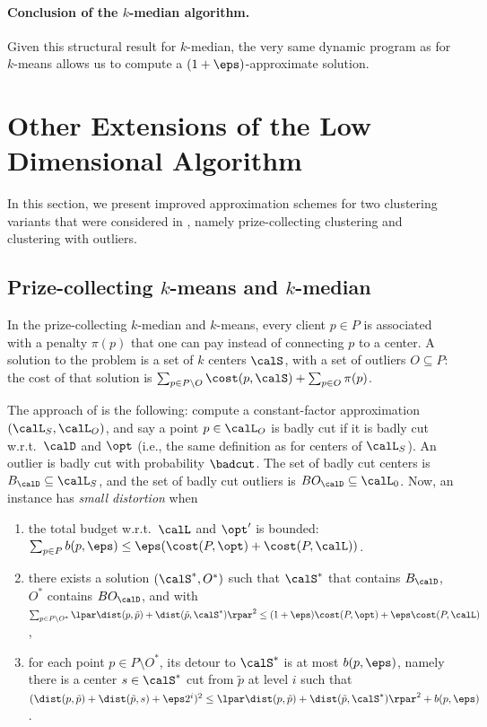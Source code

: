\paragraph{Conclusion of the $k$-median algorithm.} Given this structural result for $k$-median, the very same dynamic program as for $k$-means allows us to compute a $(1+\eps)$-approximate solution. 


\section{Other Extensions of the Low Dimensional Algorithm}\label{app:extension}
In this section, we present improved approximation schemes for two clustering variants that were considered in \cite{jacm}, namely prize-collecting clustering and clustering with outliers.

\subsection{Prize-collecting $k$-means and $k$-median}
In the prize-collecting $k$-median and $k$-means, every client $p \in P$ is associated with a penalty $\pi(p)$ that one can pay instead of connecting $p$ to a center. A solution to the problem is a set of $k$ centers $\calS$, with a set of outliers $O \subseteq P$: the cost of that solution is $\sum_{p \in P \setminus O} \cost(p, \calS) + \sum_{p \in O} \pi(p)$. 

The approach of \cite{jacm} is the following: compute a constant-factor approximation $(\calL_S, \calL_O)$, and say a point $p \in \calL_O$ is badly cut if it is badly cut w.r.t.\ $\calD$ and $\opt$ (i.e., the same definition as for centers of $\calL_S$). An outlier is badly cut with probability $\badcut$. The set of badly cut centers is $B_\calD \subseteq \calL_S$, and the set of badly cut outliers is $BO_\calD \subseteq \calL_0$.
Now, an instance has \emph{small distortion} when 
\begin{enumerate}
\item\label{prop:budget-pc} the total budget w.r.t.\ $\calL$ and $\opt'$ is bounded: $\sum_{p \in P} b(p, \eps) \leq \eps (\cost(P, \opt) + \cost(P, \calL))$.
\item\label{prop:costSstar-pc} there exists a solution $(\calS^*, O^*)$ such that $\calS^*$ that contains $B_{\calD}$, $O^*$ contains $BO_\calD$, and
with \\
$\sum_{p \in P \setminus O^*} \lpar \dist(p, \tilde p) + \dist(\tilde p,  \calS^*)\rpar^2 \leq (1+\eps)\cost(P, \opt) + \eps \cost(P, \calL)$,
\item\label{prop:det-pc} for each point $p \in P \setminus O^*$, its detour to $\calS^*$ is at most $b(p, \eps)$, namely there is a center $s \in \calS^*$ cut from $\tilde p$ at level $i$ such that $(\dist(p, \tilde p) + \dist(\tilde p, s) + \eps 2^i)^2 \leq \lpar\dist(p, \tilde p) + \dist(\tilde p, \calS^*)\rpar^2 + b(p, \eps)$.
\end{enumerate}

